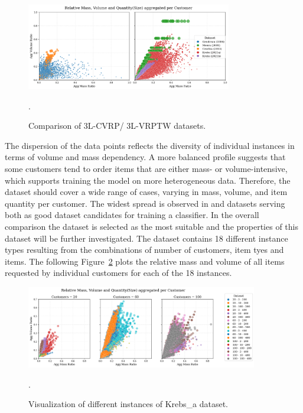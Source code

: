 \begin{figure}[ht]
    \centering
    \includegraphics[width=0.8\textwidth]{pictures/comparison_datasets_3lcvrp.png}
    \caption{Comparison of 3L-CVRP/ 3L-VRPTW datasets.}.
    \label{fig:dataset_comparison}
\end{figure}

The dispersion of the data points reflects the diversity of individual instances in terms of volume
and mass dependency. A more balanced profile suggests that some customers tend to order items that
are either mass- or volume-intensive, which supports training the model on more heterogeneous data.
Therefore, the dataset should cover a wide range of cases, varying in mass, volume, and item
quantity per customer. The widest spread is observed in \krebsADataSetText and \gendreauDataSetText datasets serving
both as good dataset candidates for training a classifier. In the overall comparison the \krebsADataSetText dataset
is selected as the most suitable and the properties of this dataset will be further investigated.
The dataset \krebsADataSetText contains 18 different instance types resulting from the combinations
of number of customers, item tyes and items. The following Figure~\ref{fig:krebs_dataset_analysis_detailes} plots
the relative mass and volume of all items requested by individual customers for each of the 18 instances.
\clearpage
\begin{figure}[ht]
    \centering
    \includegraphics[width=0.9\textwidth]{pictures/krebs_instances_detailed.png}
    \caption[Visualization of different instances of Krebs et al. (2021) dataset.]{Visualization of different instances of Krebs\_a dataset.}.
    \label{fig:krebs_dataset_analysis_detailes}
\end{figure}

